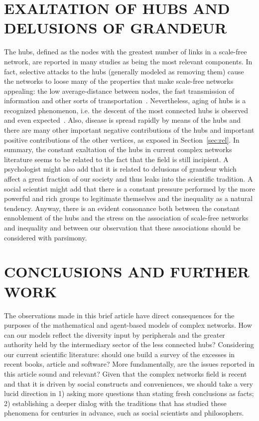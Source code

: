 \documentclass[12pt,fleqn]{article}
\begin{document}
\section{EXALTATION OF HUBS AND DELUSIONS OF GRANDEUR}\label{sec:delusion}
The hubs, defined as the nodes with the greatest number of links in a scale-free network,
are reported in many studies as being the most relevant components.
In fact, selective attacks to the hubs (generally modeled as removing them)
cause the networks to loose many of the properties that make scale-free networks
appealing: the low average-distance between nodes, the fast transmission of information
and other sorts of transportation~\citep{networks}.
Nevertheless, aging of hubs is a recognized phenomenon,
i.e. the descent of the most connected hubs is observed
and even expected~\citep{aging}.
Also, disease is spread rapidly by means of the hubs 
and there are many other important negative contributions
of the hubs and important positive contributions of the
other vertices, as exposed in Section~\ref{sec:rel}.
In summary, the constant exaltation of the hubs in current
complex networks literature seems to be related to the
fact that the field is still incipient.
A psychologist might also add that it is related to
delusions of grandeur which affect a great fraction of
our society and thus leaks into the scientific tradition.
A social scientist might add that there is a constant
pressure performed by the more powerful and rich groups
to legitimate themselves and the inequality as a natural tendency.
Anyway, there is an evident consonance both between the
constant ennoblement of the hubs and the stress on the association
of scale-free networks and inequality
and between our observation that these associations should be
considered with parsimony.


\section{CONCLUSIONS AND FURTHER WORK}\label{sec:con}
The observations made in this brief article have direct consequences for
the purposes of the mathematical and agent-based models of complex networks.
How can our models reflect the diversity input by peripherals
and the greater authority held by the intermediary sector of the less connected hubs?
Considering our current scientific literature:
should one build a survey of the
excesses in recent books, article and software?
More fundamentally, are the issues reported in this article sound
and relevant?
Given that the complex networks field is recent and that it is driven
by social constructs and conveniences, we should take a very lucid direction
in 1) asking more questions than stating fresh conclusions as facts;
2) establishing a deeper dialog with the traditions that has studied
these phenomena for centuries in advance, such as social scientists and philosophers.
\end{document}
